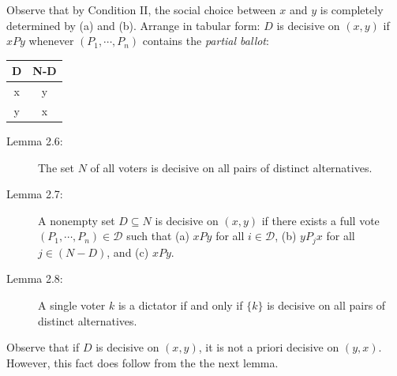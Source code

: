 \documentclass{article}
\begin{document}
Observe that by Condition II, the social choice between $x$ and $y$ is completely determined by (a) and (b). Arrange in tabular form: $D$ is decisive on $(x,y)$ if $xPy$ whenever $(P_{1}, \cdots, P_{n})$ contains the \emph{partial ballot}:
\begin{center}
\begin{tabular}{c|c}
  D & N-D \\
  \hline 
  x &  y  \\
  y &  x  \\
\end{tabular}
\end{center}

\begin{description}

\item[Lemma 2.6:] The set $N$ of all voters is decisive on all pairs of distinct alternatives.

\item[Lemma 2.7:] A nonempty set $D \subseteq N$ is decisive on $(x,y)$ if there exists a full vote $(P_{1}, \cdots, P_{n}) \in \mathcal{D}$ such that (a) $xPy$ for all $i \in \mathcal{D}$, (b) $yP_{j}x$ for all $j \in (N - D)$, and (c) $xPy$.

\item[Lemma 2.8:] A single voter $k$ is a dictator if and only if $\{ k \}$ is decisive on all pairs of distinct alternatives.

\end{description}

Observe that if $D$ is decisive on $(x,y)$, it is not a priori decisive on $(y,x)$. However, this fact does follow from the the next lemma.
\end{document}
